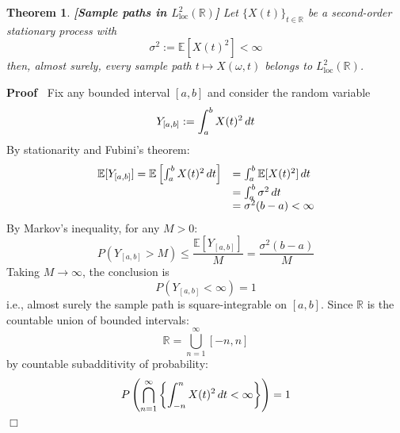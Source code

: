 \documentclass{article}
\newcommand{\assign}{:=}
\newcommand{\tmop}[1]{\ensuremath{\operatorname{#1}}}
\newcommand{\tmstrong}[1]{\textbf{#1}}
\newenvironment{proof}{\noindent\textbf{Proof\ }}{\hspace*{\fill}$\Box$\medskip}
\newtheorem{theorem}{Theorem}
\begin{document}
\begin{theorem}
  {\tmstrong{[Sample paths in $L^2_{\tmop{loc}}
  (\mathbb{R})$]\label{thm:paths_loc}}} Let $\{X (t)\}_{t \in \mathbb{R}}$ be
  a second-order stationary process with
  \begin{equation}
    \sigma^2 \assign \mathbb{E} [X (t)^2] < \infty
  \end{equation}
  then, almost surely, every sample path $t \mapsto X (\omega, t)$ belongs to
  $L^2_{\tmop{loc}} (\mathbb{R})$.
\end{theorem}

\begin{proof}
  Fix any bounded interval $[a, b]$ and consider the random variable
  \begin{equation}
    Y_{[a, b]} \assign \int_a^b X (t)^2  \hspace{0.17em} dt
  \end{equation}
  By stationarity and Fubini's theorem:
  \begin{equation}
    \begin{array}{ll}
      \mathbb{E} [Y_{[a, b]}] =\mathbb{E} \left[ \int_a^b X (t)^2 
      \hspace{0.17em} dt \right] & = \int_a^b \mathbb{E} [X (t)^2] 
      \hspace{0.17em} dt\\
      & = \int_a^b \sigma^2  \hspace{0.17em} dt\\
      & = \sigma^2  (b - a) < \infty
    \end{array}
  \end{equation}
  By Markov's inequality, for any $M > 0$:
  \begin{equation}
    P (Y_{[a, b]} > M) \leq \frac{\mathbb{E} [Y_{[a, b]}]}{M} = \frac{\sigma^2
    (b - a)}{M}
  \end{equation}
  Taking $M \to \infty$, the conclusion is
  \begin{equation}
    P (Y_{[a, b]} < \infty) = 1
  \end{equation}
  i.e., almost surely the sample path is square-integrable on $[a, b]$. Since
  $\mathbb{R}$ is the countable union of bounded intervals:
  \begin{equation}
    \mathbb{R}= \bigcup_{n = 1}^{\infty} [- n, n]
  \end{equation}
  by countable subadditivity of probability:
  \begin{equation}
    P \left( \bigcap_{n = 1}^{\infty} \left\{ \int_{- n}^n X (t)^2 
    \hspace{0.17em} dt < \infty \right\} \right) = 1

\end{equation}
\end{proof}
\end{document}
